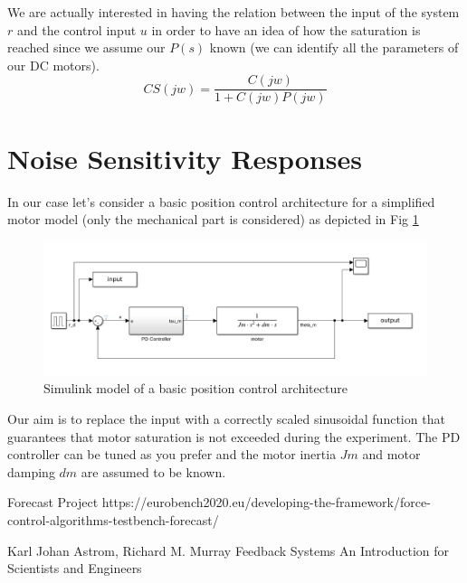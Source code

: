 \documentclass[a4paper,12pt]{article}
\begin{document}
\noindent We are actually interested in having the relation between the input of the system $r$ and the control input $u$ in order to have an idea of how the saturation is reached since we assume our $P(s)$ known (we can identify all the parameters of our DC motors).
\begin{equation}
  CS(jw) = \frac{C(jw)}{1+C(jw)P(jw)}
\end{equation}

\section{Noise Sensitivity Responses}

In our case let's consider a basic position control architecture for a simplified motor model (only the mechanical part is considered) as depicted in Fig \ref{fig:control}

\begin{figure}[H]
\begin{center}
\includegraphics[width=1\textwidth]{images/position.png}
\end{center}
\caption{Simulink model of a basic position control architecture}
\label{fig:control}
\end{figure}

\noindent Our aim is to replace the input with a correctly scaled sinusoidal function that guarantees that motor saturation is not exceeded during the experiment. The PD controller can be tuned as you prefer and the motor inertia $Jm$ and motor damping $dm$ are assumed to be known.
  

\begin{thebibliography}{9}

Forecast Project https://eurobench2020.eu/developing-the-framework/force-control-algorithms-testbench-forecast/

Karl Johan Astrom, Richard M. Murray Feedback Systems An Introduction for Scientists and Engineers
\end{thebibliography}
\end{document}
